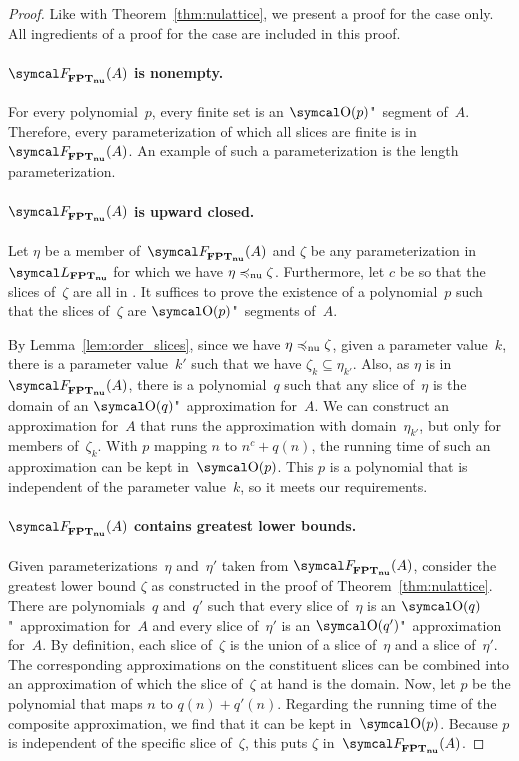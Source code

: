 \begin{proof}
  Like with Theorem~\ref{thm:nulattice}, we present a proof for the  case only.
  All ingredients of a proof for the  case are included in this proof.

  \paragraph{$\calF_\clnu{FPT}(A)$ is nonempty.}
  For every polynomial~$p$, every finite set is an $\bigO(p)$"~segment of~$A$.
  Therefore, every parameterization of which all slices are finite is in~$\calF_\clnu{FPT}(A)$.
  An example of such a parameterization is the length parameterization.

  \paragraph{$\calF_\clnu{FPT}(A)$ is upward closed.}
  Let $\eta$ be a member of~$\calF_\clnu{FPT}(A)$ and $\zeta$ be any parameterization in~$\calL_\clnu{FPT}$ for which we have $\eta \preccurlyeq_\mathrm{nu} \zeta$.
  Furthermore, let $c$ be so that the slices of~$\zeta$ are all in .
  It suffices to prove the existence of a polynomial~$p$ such that the slices of~$\zeta$ are $\bigO(p)$"~segments of~$A$.

  By Lemma~\ref{lem:order_slices}, since we have $\eta \preccurlyeq_\mathrm{nu} \zeta$, given a parameter value~$k$, there is a parameter value~$k'$ such that we have $\zeta_k \subseteq \eta_{k'}$.
  Also, as $\eta$ is in~$\calF_\clnu{FPT}(A)$, there is a polynomial~$q$ such that any slice of~$\eta$ is the domain of an $\bigO(q)$"~approximation for~$A$.
  We can construct an approximation for~$A$ that runs the approximation with domain~$\eta_{k'}$, but only for members of~$\zeta_k$.
  With $p$ mapping $n$ to $n^c + q(n)$, the running time of such an approximation can be kept in~$\bigO(p)$.
  This $p$ is a polynomial that is independent of the parameter value~$k$, so it meets our requirements.

  \paragraph{$\calF_\clnu{FPT}(A)$ contains greatest lower bounds.}
  Given parameterizations~$\eta$ and~$\eta'$ taken from $\calF_\clnu{FPT}(A)$, consider the greatest lower bound $\zeta$ as constructed in the proof of Theorem~\ref{thm:nulattice}.
  There are polynomials~$q$ and~$q'$ such that every slice of~$\eta$ is an $\bigO(q)$"~approximation for~$A$ and every slice of~$\eta'$ is an $\bigO(q')$"~approximation for~$A$.
  By definition, each slice of~$\zeta$ is the union of a slice of~$\eta$ and a slice of~$\eta'$.
  The corresponding approximations on the constituent slices can be combined into an approximation of which the slice of~$\zeta$ at hand is the domain.
  Now, let $p$ be the polynomial that maps $n$ to $q(n) + q'(n)$.
  Regarding the running time of the composite approximation, we find that it can be kept in~$\bigO(p)$.
  Because $p$ is independent of the specific slice of~$\zeta$, this puts $\zeta$ in~$\calF_\clnu{FPT}(A)$.
\end{proof}

